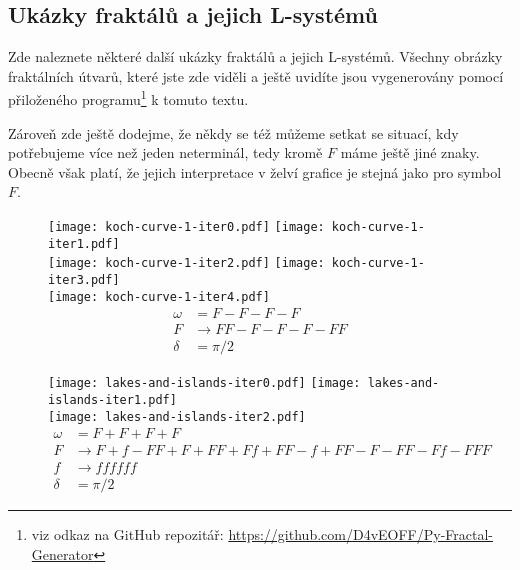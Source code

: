 \subsection{Ukázky fraktálů a jejich L-systémů}\label{subsec:ukazky-fraktalu-lsystemy}

Zde naleznete některé další ukázky fraktálů a jejich L-systémů. Všechny obrázky fraktálních útvarů, které jste zde viděli a ještě uvidíte jsou vygenerovány pomocí přiloženého programu\footnote{viz odkaz na GitHub repozitář: \url{https://github.com/D4vEOFF/Py-Fractal-Generator}} k tomuto textu.

Zároveň zde ještě dodejme, že někdy se též můžeme setkat se situací, kdy potřebujeme více než jeden neterminál, tedy kromě $F$ máme ještě jiné znaky. Obecně však platí, že jejich interpretace v želví grafice je stejná jako pro symbol $F$.
\begin{figure}[H]
    \centering
    \texttt{[image: koch-curve-1-iter0.pdf]}\qquad
    \texttt{[image: koch-curve-1-iter1.pdf]}\qquad\\
    \texttt{[image: koch-curve-1-iter2.pdf]}\qquad
    \texttt{[image: koch-curve-1-iter3.pdf]}\qquad\\
    \texttt{[image: koch-curve-1-iter4.pdf]}\qquad
    \begin{align*}
        \omega&=F-F-F-F\\
        F&\to FF-F-F-F-FF\\
        \delta&=\pi/2
    \end{align*}
\end{figure}
\begin{figure}[p]
    \centering
    \texttt{[image: lakes-and-islands-iter0.pdf]}\qquad
    \texttt{[image: lakes-and-islands-iter1.pdf]}\qquad\\
    \texttt{[image: lakes-and-islands-iter2.pdf]}
    \begin{align*}
        \omega&=F+F+F+F\\
        F&\to F+f-FF+F+FF+Ff+FF-f+FF-F-FF-Ff-FFF\\
        f&\to ffffff\\
        \delta&=\pi/2
    \end{align*}
\end{figure}
\newpage

